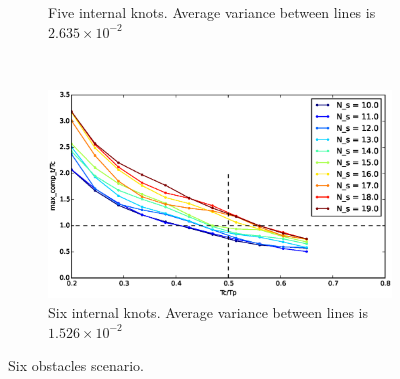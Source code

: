 \begin{figure}[!h]
\begin{subfigure}[b]{0.48\textwidth}
                \caption{Five internal knots.  Average variance between lines is $2.635\times 10^{-2}$}\label{fig:uni65}
        \end{subfigure}
        
        ~ %
        \begin{subfigure}[b]{0.48\textwidth}
                \includegraphics[width=\textwidth]{./img/realtime/Scenario_6__N_knots_6/mcttc-tctp.eps}
                \caption{Six internal knots.  Average variance between lines is $1.526\times 10^{-2}$}\label{fig:uni66}
        \end{subfigure}
        \caption{Six obstacles scenario.}\label{fig:uni6}
\end{figure}


